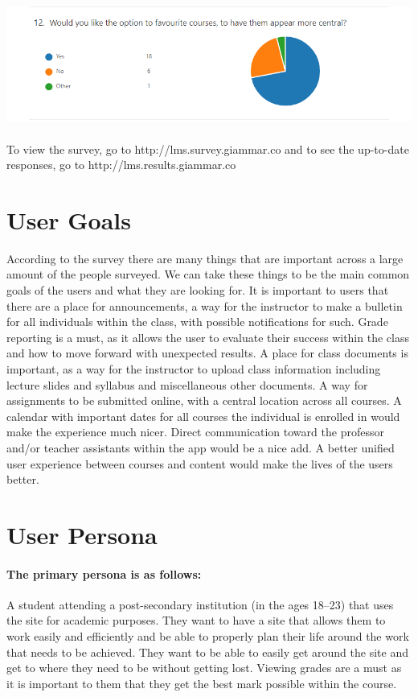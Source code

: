 \documentclass[12pt]{article}
\begin{document}
    \includegraphics[width=\textwidth]{survey/12.png}

    \paragraph{}
    To view the survey, go to http://lms.survey.giammar.co and to see the up-to-date\\responses, go to http://lms.results.giammar.co

    \section{User Goals}\label{sec:user-goals}

    According to the survey there are many things that are important across a large amount of the people surveyed.
    We can take these things to be the main common goals of the users and what they are looking for.
    It is important to users that there are a place for announcements, a way for the instructor to make a bulletin for all individuals within the class, with possible notifications for such.
    Grade reporting is a must, as it allows the user to evaluate their success within the class and how to move forward with unexpected results.
    A place for class documents is important, as a way for the instructor to upload class information including lecture slides and syllabus and miscellaneous other documents.
    A way for assignments to be submitted online, with a central location across all courses.
    A calendar with important dates for all courses the individual is enrolled in would make the experience much nicer.
    Direct communication toward the professor and/or teacher assistants within the app would be a nice add.
    A better unified user experience between courses and content would make the lives of the users better.


    \section{User Persona}\label{sec:user-persona}

    \paragraph{The primary persona is as follows:} A student attending a post-secondary institution (in the ages 18--23) that uses the site for academic purposes.
    They want to have a site that allows them to work easily and efficiently and be able to properly plan their life around the work that needs to be achieved.
    They want to be able to easily get around the site and get to where they need to be without getting lost.
    Viewing grades are a must as it is important to them that they get the best mark possible within the course.
\end{document}
